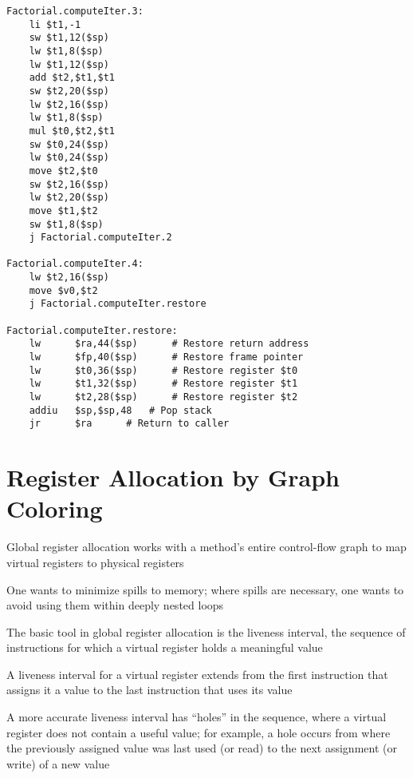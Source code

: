 \documentclass[8pt,a4paper,compress]{beamer}
\begin{document}
\begin{frame}[fragile]
\pause

\begin{lstlisting}[language={},style=focusin]
Factorial.computeIter.3:
    li $t1,-1
    sw $t1,12($sp)
    lw $t1,8($sp)
    lw $t1,12($sp)
    add $t2,$t1,$t1
    sw $t2,20($sp)
    lw $t2,16($sp)
    lw $t1,8($sp)
    mul $t0,$t2,$t1
    sw $t0,24($sp)
    lw $t0,24($sp)
    move $t2,$t0
    sw $t2,16($sp)
    lw $t2,20($sp)
    move $t1,$t2
    sw $t1,8($sp)
    j Factorial.computeIter.2

Factorial.computeIter.4:
    lw $t2,16($sp)
    move $v0,$t2
    j Factorial.computeIter.restore

Factorial.computeIter.restore:
    lw      $ra,44($sp) 	 # Restore return address
    lw      $fp,40($sp) 	 # Restore frame pointer
    lw      $t0,36($sp) 	 # Restore register $t0
    lw      $t1,32($sp) 	 # Restore register $t1
    lw      $t2,28($sp) 	 # Restore register $t2
    addiu   $sp,$sp,48 	 # Pop stack
    jr      $ra 	 # Return to caller
\end{lstlisting}
\end{frame}

\section{Register Allocation by Graph Coloring}
\begin{frame}[fragile]
\pause

Global register allocation works with a method's entire control-flow graph to map virtual registers to physical registers

\pause
\bigskip

One wants to minimize spills to memory; where spills are necessary, one wants to avoid using them within deeply nested loops

\pause
\bigskip

The basic tool in global register allocation is the liveness interval, the sequence of instructions for which a virtual register holds a meaningful value

\pause
\bigskip

A liveness interval for a virtual register extends from the first instruction that assigns it a value to the last instruction that uses its value

\pause
\bigskip

A more accurate liveness interval has ``holes'' in the sequence, where a virtual register does not contain a useful value; for example, a hole occurs from where the previously assigned value
was last used (or read) to the next assignment (or write) of a new value
\end{frame}
\end{document}
